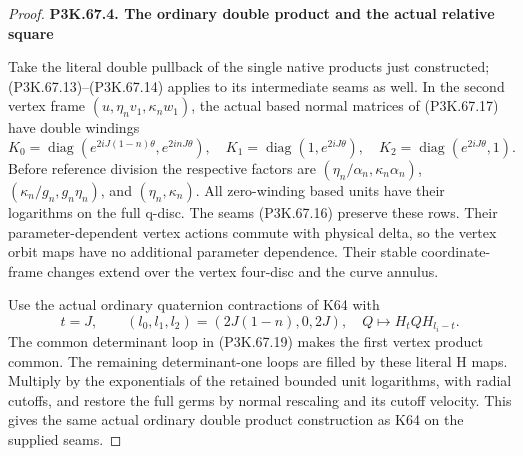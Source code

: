 \begin{proof}
\par

\medskip\noindent\textbf{P3K.67.4. The ordinary double product and the actual relative square}

\par\nobreak

Take the literal double pullback of the single native products just
constructed; (P3K.67.13)--(P3K.67.14) applies to its intermediate seams as
well. In the second vertex frame \((u,\eta_nv_1,\kappa_nw_1)\),
the actual based normal matrices of (P3K.67.17) have double windings
\[
 K_0=\operatorname{diag}(e^{2iJ(1-n)\theta},e^{2inJ\theta}),\quad
 K_1=\operatorname{diag}(1,e^{2iJ\theta}),\quad
 K_2=\operatorname{diag}(e^{2iJ\theta},1).
 \tag{P3K.67.19}
\]
Before reference division the respective factors are
\((\eta_n/\alpha_n,\kappa_n\alpha_n)\),
\((\kappa_n/g_n,g_n\eta_n)\), and \((\eta_n,\kappa_n)\).
All zero-winding based units have their logarithms on the full q-disc.
The seams (P3K.67.16) preserve these rows. Their parameter-dependent vertex
actions commute with physical delta, so the vertex orbit maps have
no additional parameter dependence. Their stable coordinate-frame
changes extend over the vertex four-disc and the curve annulus.

Use the actual ordinary quaternion contractions of K64 with
\[
 t=J,\qquad(l_0,l_1,l_2)=(2J(1-n),0,2J),\quad
 Q\mapsto H_tQH_{l_i-t}.
 \tag{P3K.67.20}
\]
The common determinant loop in (P3K.67.19) makes the first vertex product
common. The remaining determinant-one loops are filled by these
literal H maps. Multiply by the exponentials of the retained bounded
unit logarithms, with radial cutoffs, and restore the full germs by
normal rescaling and its cutoff velocity. This gives the same actual
ordinary double product construction as K64 on the supplied seams.


\end{proof}
